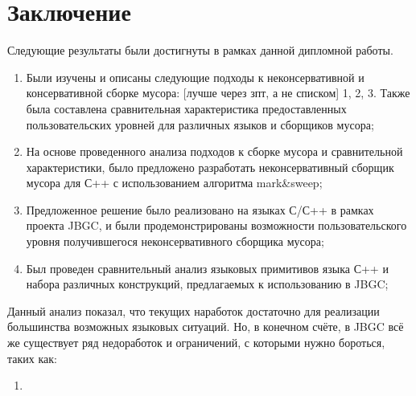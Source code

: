 \section{Заключение}

Следующие результаты были достигнуты в рамках данной дипломной работы. 

\begin{enumerate}
\item Были изучены и  описаны следующие подходы к неконсервативной и консервативной сборке мусора: [лучше через зпт, а не списком] 1, 2, 3. Также была составлена сравнительная характеристика предоставленных пользовательских уровней для различных языков и сборщиков мусора;

\item На основе проведенного анализа подходов к сборке мусора и сравнительной характеристики, было предложено разработать неконсервативный сборщик мусора для С++ с использованием алгоритма mark\&sweep;
\item Предложенное решение было реализовано на языках С/С++ в рамках проекта JBGC, и были продемонстрированы возможности пользовательского уровня получившегося неконсервативного сборщика мусора;

\item Был проведен сравнительный анализ языковых примитивов языка С++ и набора различных конструкций, предлагаемых к использованию в JBGC;
\end{enumerate}

\vspace{0.3cm}
Данный анализ показал, что текущих наработок достаточно для реализации большинства возможных языковых ситуаций. Но, в конечном счёте, в JBGC всё же существует ряд недоработок и ограничений, с которыми нужно бороться, таких как:
\begin{enumerate}
\item 
\end{enumerate}